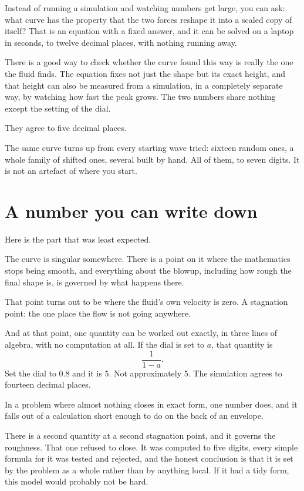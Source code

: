 \documentclass[11pt,a4paper]{article}
\begin{document}
Instead of running a simulation and watching numbers get large, you can ask:
what curve has the property that the two forces reshape it into a scaled copy
of itself? That is an equation with a fixed answer, and it can be solved on a
laptop in seconds, to twelve decimal places, with nothing running away.

There is a good way to check whether the curve found this way is really the one
the fluid finds. The equation fixes not just the shape but its exact height,
and that height can also be measured from a simulation, in a completely
separate way, by watching how fast the peak grows. The two numbers share
nothing except the setting of the dial.

They agree to five decimal places.

The same curve turns up from every starting wave tried: sixteen random ones, a
whole family of shifted ones, several built by hand. All of them, to seven
digits. It is not an artefact of where you start.

\section{A number you can write down}

Here is the part that was least expected.

The curve is singular somewhere. There is a point on it where the mathematics
stops being smooth, and everything about the blowup, including how rough the
final shape is, is governed by what happens there.

That point turns out to be where the fluid's own velocity is zero. A stagnation
point: the one place the flow is not going anywhere.

And at that point, one quantity can be worked out exactly, in three lines of
algebra, with no computation at all. If the dial is set to $a$, that quantity
is
\[
  \frac{1}{1 - a}.
\]
Set the dial to 0.8 and it is 5. Not approximately 5. The simulation agrees to
fourteen decimal places.

\begin{keybox}
In a problem where almost nothing closes in exact form, one number does, and it
falls out of a calculation short enough to do on the back of an envelope.
\end{keybox}

There is a second quantity at a second stagnation point, and it governs the
roughness. That one refused to close. It was computed to five digits, every
simple formula for it was tested and rejected, and the honest conclusion is
that it is set by the problem as a whole rather than by anything local. If it
had a tidy form, this model would probably not be hard.
\end{document}

